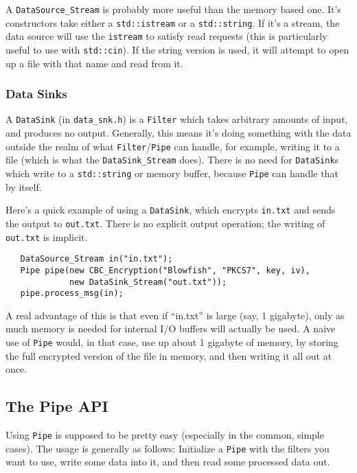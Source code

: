 \documentclass{article}
\newcommand{\filename}[1]{\texttt{#1}}
\newcommand{\type}[1]{\texttt{#1}}
\begin{document}
A \type{DataSource\_Stream} is probably more useful than the memory based
one. It's constructors take either a \type{std::istream} or a
\type{std::string}. If it's a stream, the data source will use the
\type{istream} to satisfy read requests (this is particularly useful to use
with \type{std::cin}). If the string version is used, it will attempt to open
up a file with that name and read from it.

\subsubsection{Data Sinks}

A \type{DataSink} (in \filename{data\_snk.h}) is a \type{Filter} which takes
arbitrary amounts of input, and produces no output. Generally, this means it's
doing something with the data outside the realm of what
\type{Filter}/\type{Pipe} can handle, for example, writing it to a file (which
is what the \type{DataSink\_Stream} does). There is no need for
\type{DataSink}s which write to a \type{std::string} or memory buffer, because
\type{Pipe} can handle that by itself.

Here's a quick example of using a \type{DataSink}, which encrypts
\filename{in.txt} and sends the output to \filename{out.txt}. There is
no explicit output operation; the writing of \filename{out.txt} is
implicit.

\begin{verbatim}
   DataSource_Stream in("in.txt");
   Pipe pipe(new CBC_Encryption("Blowfish", "PKCS7", key, iv),
             new DataSink_Stream("out.txt"));
   pipe.process_msg(in);
\end{verbatim}

A real advantage of this is that even if ``in.txt'' is large (say, 1
gigabyte), only as much memory is needed for internal I/O buffers will actually
be used. A naive use of \type{Pipe} would, in that case, use up about 1
gigabyte of memory, by storing the full encrypted version of the file in
memory, and then writing it all out at once.

\subsection{The Pipe API}

Using \type{Pipe} is supposed to be pretty easy (especially in the common,
simple cases). The usage is generally as follows: Initialize a \type{Pipe} with
the filters you want to use, write some data into it, and then read some
processed data out.
\end{document}
